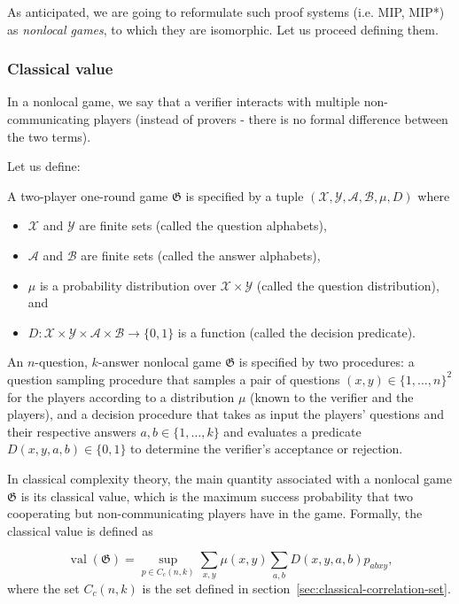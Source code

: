 As anticipated, we are going to reformulate such proof systems (i.e. MIP, MIP*) as \emph{nonlocal games}, to which they are isomorphic. Let us proceed defining them.
\subsubsection{Classical value}

In a nonlocal game, we say that a verifier interacts with multiple non-communicating players (instead of provers - there is no formal difference between the two terms). 

Let us define: 

\begin{defn} A two-player one-round game $\mathfrak{G}$ is specified by a tuple $(\mathcal{X}, \mathcal{Y}, \mathcal{A}, \mathcal{B}, \mu, D)$ where
    \begin{itemize}
        \item $\mathcal{X}$ and $\mathcal{Y}$ are finite sets (called the question alphabets),
        \item $\mathcal{A}$ and $\mathcal{B}$ are finite sets (called the answer alphabets),
        \item $\mu$ is a probability distribution over $\mathcal{X} \times \mathcal{Y}$ (called the question distribution), and
        \item $D: \mathcal{X} \times \mathcal{Y} \times \mathcal{A} \times \mathcal{B} \rightarrow\{0,1\}$ is a function (called the decision predicate).
    \end{itemize}
\end{defn}

An $n$-question, $k$-answer nonlocal game $\mathfrak{G}$ is specified by two procedures: a question sampling procedure that samples a pair of questions $(x, y) \in\{1, \ldots, n\}^{2}$ for the players according to a distribution $\mu$ (known to the verifier and the players), and a decision procedure that takes as input the players' questions and their respective answers $a, b \in\{1, \ldots, k\}$ and evaluates a predicate $D(x, y, a, b) \in\{0,1\}$ to determine the verifier's acceptance or rejection.

In classical complexity theory, the main quantity associated with a nonlocal game $\mathfrak{G}$ is its classical value, which is the maximum success probability that two cooperating but non-communicating players have in the game. Formally, the classical value is defined as

\begin{defn}\label{eq:classical-value}
\begin{equation}
\operatorname{val}(\mathfrak{G})=\sup _{p \in C_{c}(n, k)} \sum_{x, y} \mu(x, y) \sum_{a, b} D(x, y, a, b) p_{a b x y},
\end{equation}
where the set $C_{c}(n, k)$ is the set defined in section~\ref{sec:classical-correlation-set}.
\end{defn}

